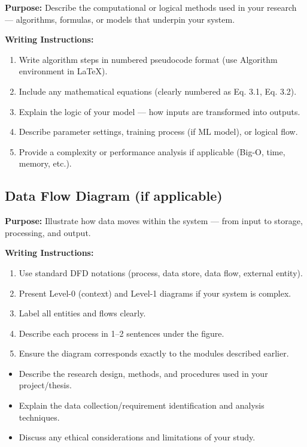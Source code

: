 {\color{blue}\textbf{Purpose:}
Describe the computational or logical methods used in your research — algorithms, formulas, or models that underpin your system.} \\

{\color{red}\textbf{Writing Instructions:}
\begin{enumerate}
    \item Write algorithm steps in numbered pseudocode format (use Algorithm environment in LaTeX).
    
    \item Include any mathematical equations (clearly numbered as Eq. 3.1, Eq. 3.2).
    
    \item Explain the logic of your model — how inputs are transformed into outputs.
    
    \item Describe parameter settings, training process (if ML model), or logical flow.
    
    \item Provide a complexity or performance analysis if applicable (Big-O, time, memory, etc.).
\end{enumerate}}


\subsection{Data Flow Diagram (if applicable)}

{\color{blue}\textbf{Purpose:}
Illustrate how data moves within the system — from input to storage, processing, and output.}

{\color{red}\textbf{Writing Instructions:}
\begin{enumerate}
    \item Use standard DFD notations (process, data store, data flow, external entity).
    
    \item Present Level-0 (context) and Level-1 diagrams if your system is complex.
    
    \item Label all entities and flows clearly.
    
    \item Describe each process in 1–2 sentences under the figure.
    
    \item Ensure the diagram corresponds exactly to the modules described earlier.
\end{enumerate}


\begin{itemize}
    \item Describe the research design, methods, and procedures used in your project/thesis.
    \item Explain the data collection/requirement identification and analysis techniques.
    \item Discuss any ethical considerations and limitations of your study.
\end{itemize}}




